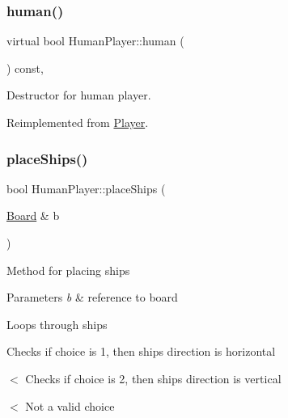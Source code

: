 \subsubsection{\texorpdfstring{human()}{human()}}
{\footnotesize\ttfamily virtual bool Human\+Player\+::human (\begin{DoxyParamCaption}{ }\end{DoxyParamCaption}) const\hspace{0.3cm}{\ttfamily [inline]}, {\ttfamily [virtual]}}



Destructor for human player. 



Reimplemented from \mbox{\hyperlink{class_player_a47c5497b2d8bf5d745e85952d0bf097f}{Player}}.

\mbox{\label{class_human_player_ae9315a3c66f6b2f2bf4d1ebb09669aff}} 
\subsubsection{\texorpdfstring{place\+Ships()}{placeShips()}}
{\footnotesize\ttfamily bool Human\+Player\+::place\+Ships (\begin{DoxyParamCaption}\item[{\mbox{\hyperlink{class_board}{Board}} \&}]{b }\end{DoxyParamCaption})\hspace{0.3cm}{\ttfamily [virtual]}}

Method for placing ships 
\begin{DoxyParams}{Parameters}
{\em b} & reference to board \\
\hline
\end{DoxyParams}
Loops through ships

Checks if choice is 1, then ship\textquotesingle{}s direction is horizontal

$<$ Checks if choice is 2, then ship\textquotesingle{}s direction is vertical

$<$ Not a valid choice

